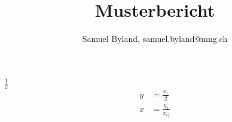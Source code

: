 \documentclass[11pt, oneside]{article}   	%
\title{Musterbericht}
\author{Samuel Byland, samuel.byland@mng.ch}
\begin{document}
\maketitle
\section{}
$\frac{1}{2}$
\begin{align}
	y &= \frac{x_1}{2}\\
	x &= \frac{y_1}{x_{ij}}
\end{align}
\subsection{}
\end{document}
